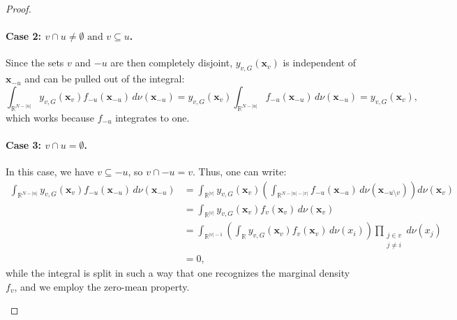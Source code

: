\begin{proof}
\paragraph{Case 2: $v \cap u \ne \emptyset \text{ and } v \subseteq u$.}
Since the sets $v$ and $-u$ are then completely disjoint, $y_{v,G}(\boldsymbol{x}_v)$ is independent of $\boldsymbol{x}_{-u}$ and can be pulled out of the integral:
\[
\int_{\mathbb{R}^{N - |u|}} y_{v,G}(\boldsymbol{x}_v) f_{-u}(\boldsymbol{x}_{-u}) \, d \nu(\boldsymbol{x}_{-u})
= y_{v,G}(\boldsymbol{x}_v) \int_{\mathbb{R}^{N - |u|}} f_{-u}(\boldsymbol{x}_{-u}) \, d \nu(\boldsymbol{x}_{-u})
= y_{v,G}(\boldsymbol{x}_v),
\]
which works because $f_{-u}$ integrates to one.
\begin{center}
\end{center}
\paragraph{Case 3: \( v \cap u = \emptyset \).}
In this case, we have \( v \subseteq -u \), so \( v \cap -u = v \). Thus, one can write:
\[
\begin{aligned}
\int_{\mathbb{R}^{N - |u|}} y_{v,G}(\boldsymbol{x}_v) f_{-u}(\boldsymbol{x}_{-u}) \, d \nu(\boldsymbol{x}_{-u})
&= \int_{\mathbb{R}^{|v|}} y_{v,G}(\boldsymbol{x}_v)
\left( \int_{\mathbb{R}^{N - |u| - |v|}} f_{-u}(\boldsymbol{x}_{-u}) \, d \nu(\boldsymbol{x}_{-u \setminus v}) \right)
d \nu(\boldsymbol{x}_v) \\[3ex]
&= \int_{\mathbb{R}^{|v|}} y_{v,G}(\boldsymbol{x}_v) f_v(\boldsymbol{x}_v) \, d \nu(\boldsymbol{x}_v) \\[3ex]
&= \int_{\mathbb{R}^{|v|-1}} \left( \int_{\mathbb{R}} y_{v,G}(\boldsymbol{x}_v) f_v(\boldsymbol{x}_v) \, d \nu(x_i) \right)
\prod_{\substack{j \in v \\ j \ne i}} d \nu (x_j) \\
&= 0,
\end{aligned}
\]
while the integral is split in such a way that one recognizes the marginal density $f_v$, and we employ the zero-mean property.
\begin{center}
\end{center}
\end{proof}
